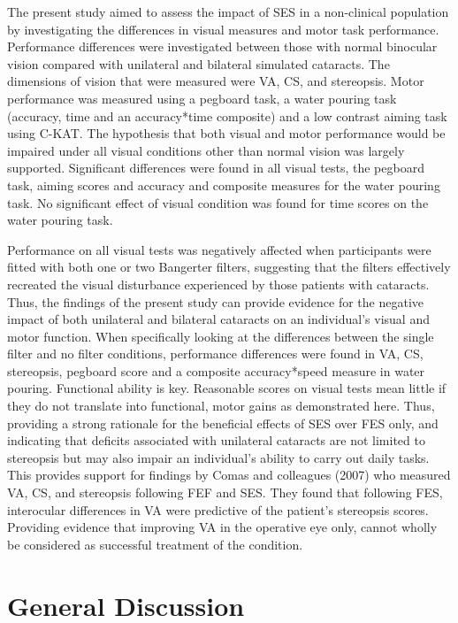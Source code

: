 \documentclass[
  english,
  man,floatsintext]{apa6}
\begin{document}
The present study aimed to assess the impact of SES in a non-clinical population by investigating the differences in visual measures and motor task performance.
Performance differences were investigated between those with normal binocular vision compared with unilateral and bilateral simulated cataracts.
The dimensions of vision that were measured were VA, CS, and stereopsis. Motor performance was measured using a pegboard task, a water pouring task (accuracy, time and an accuracy*time composite) and a low contrast aiming task using C-KAT.
The hypothesis that both visual and motor performance would be impaired under all visual conditions other than normal vision was largely supported.
Significant differences were found in all visual tests, the pegboard task, aiming scores and accuracy and composite measures for the water pouring task.
No significant effect of visual condition was found for time scores on the water pouring task.

Performance on all visual tests was negatively affected when participants were fitted with both one or two Bangerter filters, suggesting that the filters effectively recreated the visual disturbance experienced by those patients with cataracts.
Thus, the findings of the present study can provide evidence for the negative impact of both unilateral and bilateral cataracts on an individual's visual and motor function.
When specifically looking at the differences between the single filter and no filter conditions, performance differences were found in VA, CS, stereopsis, pegboard score and a composite accuracy*speed measure in water pouring.
Functional ability is key. Reasonable scores on visual tests mean little if they do not translate into functional, motor gains as demonstrated here.
Thus, providing a strong rationale for the beneficial effects of SES over FES only, and indicating that deficits associated with unilateral cataracts are not limited to stereopsis but may also impair an individual's ability to carry out daily tasks.
This provides support for findings by Comas and colleagues (2007) who measured VA, CS, and stereopsis following FEF and SES.
They found that following FES, interocular differences in VA were predictive of the patient's stereopsis scores.
Providing evidence that improving VA in the operative eye only, cannot wholly be considered as successful treatment of the condition.

\hypertarget{general-discussion}{%
\section{General Discussion}\label{general-discussion}}
\end{document}

